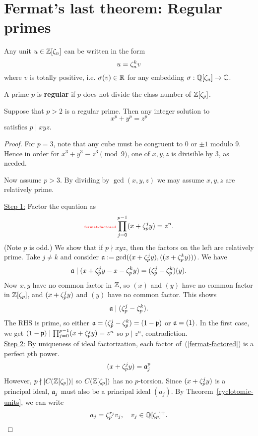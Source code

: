 \section{Fermat's last theorem: Regular primes}
\begin{thm}
Any unit $u\in \mathbb{Z}[\zeta_n]$ can be written in the form
\[
u=\zeta_n^k v
\]
where $v$ is totally positive, i.e. $\sigma(v)\in \mathbb{R}$ for any embedding $\sigma:\mathbb{Q}[\zeta_n]\to \mathbb{C}$.
\end{thm}
\begin{df}
A prime $p$ is \textbf{regular} if $p$ does not divide the class number of $\mathbb{Z}[\zeta_p]$.
\end{df}
\begin{thm}
Suppose that $p>2$ is a regular prime. Then any integer solution to
\[
x^p+y^p=z^p
\]
satisfies $p\mid xyz$.
\end{thm}
\begin{proof}
For $p=3$, note that any cube must be congruent to $0$ or $\pm 1$ modulo 9. Hence in order for $x^3+y^3\equiv z^3\pmod 9$, one of $x,y,z$ is divisible by $3$, as needed.

Now assume $p>3$. By dividing by $\gcd(x,y,z)$ we may assume $x,y,z$ are relatively prime.

\noindent\underline{Step 1:} Factor the equation as
\begin{equation}\llabel{fermat-factored}
\prod_{j=0}^{p-1}(x+\ze_p^j y)=z^n.
\end{equation}
(Note $p$ is odd.) We show that if $p\nmid xyz$, then the factors on the left are relatively prime. Take $j\ne k$ and consider $\mathfrak{a}:=\gcd((x+\zeta_p^j y),((x+\zeta_p^k y)))$. We have
\[
\mathfrak{a}\mid (x+\zeta_p^j y-x-\zeta_p^k y)=(\zeta_p^j-\zeta_p^k)(y).
\]
Now $x,y$ have no common factor in $\mathbb{Z}$, so $(x)$ and $(y)$ have no common factor in $\mathbb{Z}[\zeta_p]$, %
and $(x+\zeta_p^j y)$ and $(y)$ have no common factor. This shows
\[
\mathfrak{a}\mid (\zeta_p^j-\zeta_p^k).
\]
The RHS is prime, so either $\mathfrak{a}=(\zeta_p^j-\zeta_p^k)=(1-\mathfrak{p})$ or $\mathfrak{a}=(1)$. In the first case, we get $(1-\mathfrak{p})\mid \prod_{j=0}^{p-1}(x+\zeta_p^j y)=z^n$ so $p\mid z^n$, contradiction.\\

\noindent\underline{Step 2:} By uniqueness of ideal factorization, each factor of~(\ref{fermat-factored}) is a perfect $p$th power.
\[(x+\zeta_p^jy)=\mathfrak{a}_j^p\]
However, $p\nmid |C(\mathbb{Z}[\zeta_p])|$ so $C(\mathbb{Z}[\zeta_p])$ has no $p$-torsion. Since $(x+\zeta_p^jy)$ is a principal ideal, $\mathfrak{a}_j$ must also be a principal ideal $(a_j)$. By Theorem~\ref{cyclotomic-units}, we can write
\[
a_j=\zeta_p^{r_j}v_j,\quad v_j\in \mathbb{Q}[\zeta_p]^+.
\] 
\end{proof}

